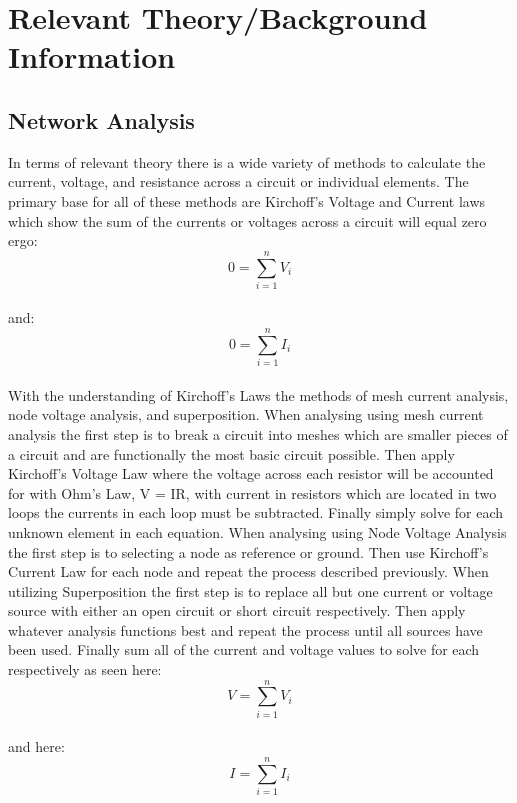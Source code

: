 \documentclass[a4paper]{article}
\begin{document}
\pagebreak
\section{Relevant Theory/Background Information}

\subsection{Network Analysis}
In terms of relevant theory there is a wide variety of methods to calculate the current, voltage, and resistance across a circuit or individual elements. The primary base for all of these methods are Kirchoff's Voltage and Current
laws which show the sum of the currents or voltages across a circuit will equal zero ergo: \\
\[0 = \sum_{i=1}^{n} V_{i}\]\\
and: \\
\[0 = \sum_{i=1}^{n} I_{i}\]\\
With the understanding of Kirchoff's Laws the methods of mesh current analysis, node voltage analysis, and superposition. 
When analysing using mesh current analysis the first step is to break a circuit into meshes which are smaller pieces of a circuit and are functionally the most basic circuit possible.
Then apply Kirchoff's Voltage Law where the voltage across each resistor will be accounted for with Ohm's Law, V = IR, with current in resistors which are located in two loops the currents in each loop must be subtracted. Finally simply solve for each unknown element in each equation.
When analysing using Node Voltage Analysis the first step is to selecting a node as reference or ground. Then use Kirchoff's Current Law for each node and repeat the process described previously.
When utilizing Superposition the first step is to replace all but one current or voltage source with either an open circuit or short circuit respectively. Then apply whatever analysis functions best and repeat the process until all sources have been used. Finally sum all of the current and voltage values to solve for each respectively as seen here:
\[V = \sum_{i=1}^{n} V_{i}\]\\
and here: \\
\[I = \sum_{i=1}^{n} I_{i}\]\\  
\end{document}
